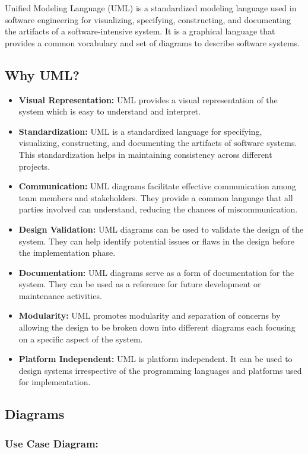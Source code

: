 \documentclass{article}
\begin{document}
Unified Modeling Language (UML) is a standardized modeling language used in software engineering for visualizing, specifying, constructing, and documenting the artifacts of a software-intensive system. It is a graphical language that provides a common vocabulary and set of diagrams to describe software systems.

\subsection[Why UML?]{Why UML?}

\begin{itemize}
    \item \textbf{Visual Representation:} UML provides a visual representation of the system which is easy to understand and interpret.
    \item \textbf{Standardization:} UML is a standardized language for specifying, visualizing, constructing, and documenting the artifacts of software systems. This standardization helps in maintaining consistency across different projects.
    \item \textbf{Communication:} UML diagrams facilitate effective communication among team members and stakeholders. They provide a common language that all parties involved can understand, reducing the chances of miscommunication.
    \item \textbf{Design Validation:} UML diagrams can be used to validate the design of the system. They can help identify potential issues or flaws in the design before the implementation phase.
    \item \textbf{Documentation:} UML diagrams serve as a form of documentation for the system. They can be used as a reference for future development or maintenance activities.
    \item \textbf{Modularity:} UML promotes modularity and separation of concerns by allowing the design to be broken down into different diagrams each focusing on a specific aspect of the system.
    \item \textbf{Platform Independent:} UML is platform independent. It can be used to design systems irrespective of the programming languages and platforms used for implementation.
\end{itemize}

\subsection[Diagrams]{Diagrams}
\subsubsection*{Use Case Diagram:}
\end{document}
